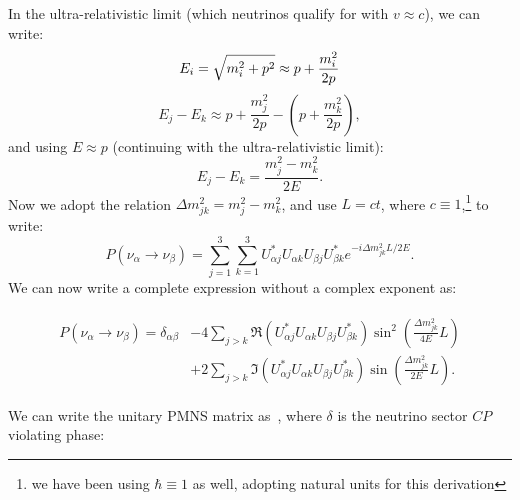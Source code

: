 \documentclass[aps,prd,twocolumn,nofootinbib]{revtex4-1}
\begin{document}
In the ultra-relativistic limit (which neutrinos qualify for with $v \approx c$), we can write:
\begin{equation}
  E_i = \sqrt{m_i^2+p^2} \approx p + \frac{m_i^2}{2p} \\
  \label{eq:approx1}
\end{equation}
\begin{equation}
  E_j - E_k \approx p + \frac{m_j^2}{2p} - \left(p + \frac{m_k^2}{2p}\right),
  \label{eq:approx2}
\end{equation}
and using $E \approx p$ (continuing with the ultra-relativistic limit):
\begin{equation}
  E_j - E_k = \frac{m_j^2 - m_k^2}{2E}.
  \label{eq:approx3}
\end{equation}
Now we adopt the relation $\Delta m_{jk}^2 = m_j^2 - m_k^2$, and use $L = ct$, where $c\equiv1$,\footnote{we have been using $\hbar \equiv 1$ as well, adopting natural units for this derivation} to write:
\begin{equation}
  P(\nu_{\alpha}\rightarrow\nu_{\beta}) = \sum_{j=1}^3\sum_{k=1}^3U_{\alpha j}^*U_{\alpha k}U_{\beta j}U_{\beta k}^*e^{-i\Delta m_{jk}^2L/2E}.
\end{equation}
We can now write a complete expression without a complex exponent as:
\begin{widetext}
  \begin{align}
    \begin{split}
      P(\nu_{\alpha}\rightarrow\nu_{\beta}) = \delta_{\alpha\beta} & - 4\sum_{j>k}\Re\left(U_{\alpha j}^*U_{\alpha k}U_{\beta j}U_{\beta k}^*\right)\sin^2\left(\frac{\Delta m_{jk}^2}{4E}L\right) \\
      & + 2\sum_{j>k}\Im\left(U_{\alpha j}^*U_{\alpha k}U_{\beta j}U_{\beta k}^*\right)\sin\left(\frac{\Delta m_{jk}^2}{2E}L\right).
    \end{split}
  \end{align}
\end{widetext}
  We can write the unitary PMNS matrix as~\cite{matrixpara}, where $\delta$ is the neutrino sector $CP$ violating phase:
\end{document}
